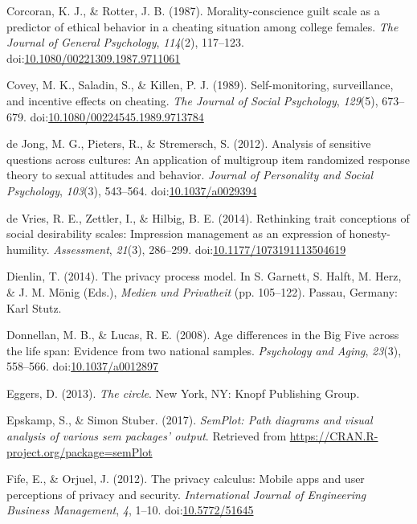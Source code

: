 \documentclass[man,floatsintext]{apa6}
\theoremstyle{definition}
\theoremstyle{definition}
\theoremstyle{definition}
\theoremstyle{remark}
\begin{document}
\leavevmode\hypertarget{ref-Corcoran.1987}{}%
Corcoran, K. J., \& Rotter, J. B. (1987). Morality-conscience guilt
scale as a predictor of ethical behavior in a cheating situation among
college females. \emph{The Journal of General Psychology},
\emph{114}(2), 117--123.
doi:\href{https://doi.org/10.1080/00221309.1987.9711061}{10.1080/00221309.1987.9711061}

\leavevmode\hypertarget{ref-Covey.1989}{}%
Covey, M. K., Saladin, S., \& Killen, P. J. (1989). Self-monitoring,
surveillance, and incentive effects on cheating. \emph{The Journal of
Social Psychology}, \emph{129}(5), 673--679.
doi:\href{https://doi.org/10.1080/00224545.1989.9713784}{10.1080/00224545.1989.9713784}

\leavevmode\hypertarget{ref-deJong.2012}{}%
de Jong, M. G., Pieters, R., \& Stremersch, S. (2012). Analysis of
sensitive questions across cultures: An application of multigroup item
randomized response theory to sexual attitudes and behavior.
\emph{Journal of Personality and Social Psychology}, \emph{103}(3),
543--564. doi:\href{https://doi.org/10.1037/a0029394}{10.1037/a0029394}

\leavevmode\hypertarget{ref-deVries.2014}{}%
de Vries, R. E., Zettler, I., \& Hilbig, B. E. (2014). Rethinking trait
conceptions of social desirability scales: Impression management as an
expression of honesty-humility. \emph{Assessment}, \emph{21}(3),
286--299.
doi:\href{https://doi.org/10.1177/1073191113504619}{10.1177/1073191113504619}

\leavevmode\hypertarget{ref-Dienlin.2014}{}%
Dienlin, T. (2014). The privacy process model. In S. Garnett, S. Halft,
M. Herz, \& J. M. Mönig (Eds.), \emph{Medien und Privatheit} (pp.
105--122). Passau, Germany: Karl Stutz.

\leavevmode\hypertarget{ref-Donnellan.2008}{}%
Donnellan, M. B., \& Lucas, R. E. (2008). Age differences in the Big
Five across the life span: Evidence from two national samples.
\emph{Psychology and Aging}, \emph{23}(3), 558--566.
doi:\href{https://doi.org/10.1037/a0012897}{10.1037/a0012897}

\leavevmode\hypertarget{ref-Eggers.2013}{}%
Eggers, D. (2013). \emph{The circle}. New York, NY: Knopf Publishing
Group.

\leavevmode\hypertarget{ref-R-semPlot}{}%
Epskamp, S., \& Simon Stuber. (2017). \emph{SemPlot: Path diagrams and
visual analysis of various sem packages' output}. Retrieved from
\url{https://CRAN.R-project.org/package=semPlot}

\leavevmode\hypertarget{ref-Fife.2012}{}%
Fife, E., \& Orjuel, J. (2012). The privacy calculus: Mobile apps and
user perceptions of privacy and security. \emph{International Journal of
Engineering Business Management}, \emph{4}, 1--10.
doi:\href{https://doi.org/10.5772/51645}{10.5772/51645}
\end{document}
